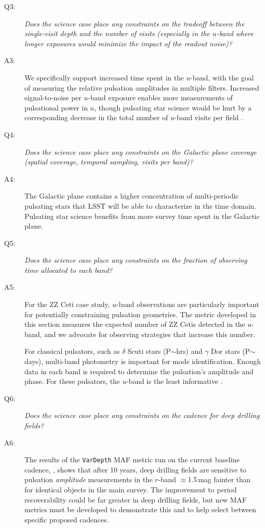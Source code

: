 \begin{description}
 \item[Q3:] {\it Does the science case place any constraints on the
 tradeoff between the single-visit depth and the number of visits
 (especially in the $u$-band where longer exposures would minimize the
 impact of the readout noise)?}

 \item[A3:] We specifically support increased time spent in the
 $u$-band, with the goal of measuring the relative pulsation amplitudes
 in multiple filters. Increased signal-to-noise per $u$-band exposure enables
 more measurements of pulsational power in $u$, though pulsating star
 science would be hurt by a corresponding decrease in the total number of
 $u$-band visits per field .

 \item[Q4:] {\it Does the science case place any constraints on the
 Galactic plane coverage (spatial coverage, temporal sampling, visits per
 band)?}

 \item[A4:] The Galactic plane contains a higher concentration of multi-periodic
 pulsating stars that LSST will be able to characterize in the time domain.
 Pulsating star science benefits from more survey time spent in the Galactic
 plane.

 \item[Q5:] {\it Does the science case place any constraints on the
 fraction of observing time allocated to each band?}

 \item[A5:] For the ZZ Ceti case study, $u$-band observations are particularly
 important for potentially constraining pulsation geometries. The metric
 developed in this section measures the expected number of ZZ Cetis
 detected in the $u$-band, and we advocate for observing strategies
 that increase this number.

 For classical pulsators, such as $\delta$ Scuti stars (P$\sim$hrs) and $\gamma$ Dor stars (P$\sim$days), multi-band photometry is important for mode identification. Enough data in each band is required to determine the pulsation's amplitude and phase. For these pulsators, the $u$-band is the least informative \citep[e.g.,][]{1990A&A...234..262G}.

 \item[Q6:] {\it Does the science case place any constraints on the
 cadence for deep drilling fields?}

 \item[A6:] The results of the {\tt VarDepth} MAF metric run on the
 current baseline cadence, , shows that after
 10 years, deep drilling fields are sensitive to pulsation
 \emph{amplitude} measurements in the $r$-band $\approx$1.5\,mag fainter
 than for identical objects in the main survey.  The improvement to
 period recoverability could be far greater in deep drilling fields, but
 new MAF metrics must be developed to demonstrate this and to help
 select between specific proposed cadences.


\end{description}
